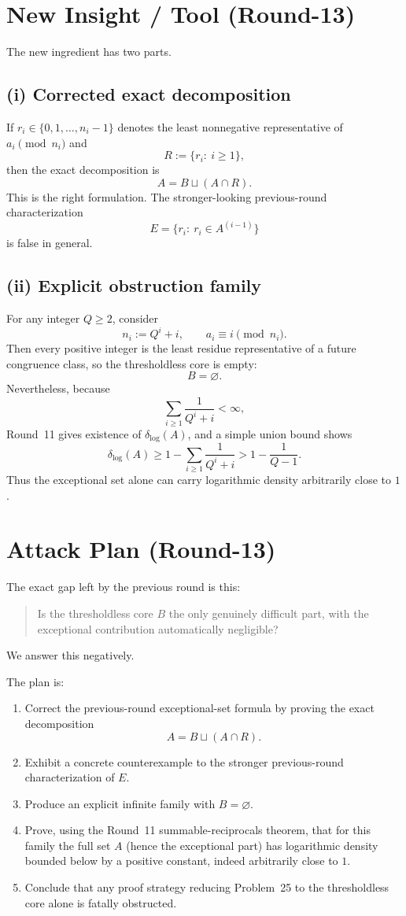 \section{New Insight / Tool (Round-13)}
The new ingredient has two parts.

\subsection*{(i) Corrected exact decomposition}
If \(r_i\in\{0,1,\dots,n_i-1\}\) denotes the least nonnegative representative of \(a_i\pmod{n_i}\) and
\[
R:=\{r_i:\ i\ge 1\},
\]
then the exact decomposition is
\[
A=B\sqcup (A\cap R).
\]
This is the right formulation.  The stronger-looking previous-round characterization
\[
E=\{r_i:\ r_i\in A^{(i-1)}\}
\]
is false in general.

\subsection*{(ii) Explicit obstruction family}
For any integer \(Q\ge 2\), consider
\[
n_i:=Q^i+i,
\qquad
 a_i\equiv i\pmod{n_i}.
\]
Then every positive integer is the least residue representative of a future congruence class, so the thresholdless core is empty:
\[
B=\varnothing.
\]
Nevertheless, because
\[
\sum_{i\ge 1}\frac1{Q^i+i}<\infty,
\]
Round~11 gives existence of \(\delta_{\log}(A)\), and a simple union bound shows
\[
\delta_{\log}(A)\ge 1-\sum_{i\ge 1}\frac1{Q^i+i}>1-\frac1{Q-1}.
\]
Thus the exceptional set alone can carry logarithmic density arbitrarily close to \(1\).

\section{Attack Plan (Round-13)}
The exact gap left by the previous round is this:
\begin{quote}
Is the thresholdless core \(B\) the only genuinely difficult part, with the exceptional contribution automatically negligible?
\end{quote}
We answer this negatively.

The plan is:
\begin{enumerate}
\item Correct the previous-round exceptional-set formula by proving the exact decomposition
\[
A=B\sqcup (A\cap R).
\]
\item Exhibit a concrete counterexample to the stronger previous-round characterization of \(E\).
\item Produce an explicit infinite family with \(B=\varnothing\).
\item Prove, using the Round~11 summable-reciprocals theorem, that for this family the full set \(A\) (hence the exceptional part) has logarithmic density bounded below by a positive constant, indeed arbitrarily close to \(1\).
\item Conclude that any proof strategy reducing Problem~25 to the thresholdless core alone is fatally obstructed.
\end{enumerate}

